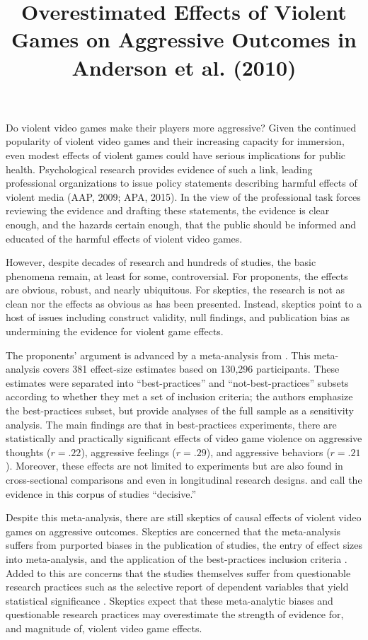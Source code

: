 \documentclass[man, mask]{apa6}
\title{Overestimated Effects of Violent Games on Aggressive Outcomes in Anderson et al. (2010)}
\begin{document}
\maketitle


Do violent video games make their players more aggressive? Given the continued popularity of violent video games and their increasing capacity for immersion, even modest effects of violent games could have serious implications for public health. Psychological research provides evidence of such a link, leading professional organizations to issue policy statements describing harmful effects of violent media (AAP, 2009; APA, 2015). In the view of the professional task forces reviewing the evidence and drafting these statements, the evidence is clear enough, and the hazards certain enough, that the public should be informed and educated of the harmful effects of violent video games. \nocite{APA:2015,AAP:2009}

However, despite decades of research and hundreds of studies, the basic phenomena remain, at least for some, controversial.  For proponents, the effects are obvious, robust, and nearly ubiquitous. For skeptics, the research is not as clean nor the effects as obvious as has been presented.  Instead, skeptics point to a host of issues including construct validity, null findings, and publication bias as undermining the evidence for violent game effects.

The proponents' argument is advanced by a meta-analysis from \citet{Anderson:etal:2010}.  This meta-analysis covers 381 effect-size estimates based on 130,296 participants.  These estimates were separated into ``best-practices'' and ``not-best-practices'' subsets according to whether they met a set of inclusion criteria; the authors emphasize the best-practices subset, but provide analyses of the full sample as a sensitivity analysis. The main findings are that in best-practices experiments, there are statistically and practically significant effects of video game violence on aggressive thoughts ($r = .22$),  aggressive feelings ($r = .29$), and aggressive behaviors ($r = .21$).  Moreover, these effects are not limited to experiments but are also found in cross-sectional comparisons and even in longitudinal research designs. \citet{Bushman:etal:2010} and \citet{Huesmann:2010} call the evidence in this corpus of studies ``decisive.'' 

Despite this meta-analysis, there are still skeptics of causal effects of violent video games on aggressive outcomes.  Skeptics are concerned that the \citet{Anderson:etal:2010} meta-analysis suffers from purported biases in the publication of studies, the entry of effect sizes into meta-analysis, and the application of the best-practices inclusion criteria \citep[e.g.,][]{Ferguson:2010}.  Added to this are concerns that the studies themselves suffer from questionable research practices such as the selective report of dependent variables that yield statistical significance \citep{Elson:etal:2014}. Skeptics expect that these meta-analytic biases and questionable research practices may overestimate the strength of evidence for, and magnitude of, violent video game effects.
\end{document}
